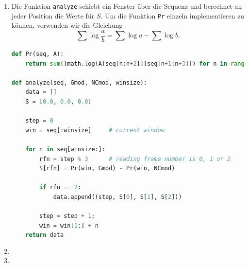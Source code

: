 \documentclass{homework}
\begin{document}
\begin{enumerate}
\begin{enumerate}
\normalsize

\item

Die Funktion \texttt{analyze} schiebt ein Fenster über die Sequenz und berechnet an jeder Position die Werte für $S$.
Um die Funktion \texttt{Pr} einzeln implementieren zu können, verwenden wir die Gleichung
$$\sum \log \frac{a}{b} = \sum \log a - \sum \log b.$$

\begin{lstlisting}[language=python]
def Pr(seq, A):
	return sum([math.log(A[seq[n:n+2]][seq[n+1:n+3]]) for n in range(0, len(seq)-3)])

def analyze(seq, Gmod, NCmod, winsize):
	data = []
	S = [0.0, 0.0, 0.0]

	step = 0
	win = seq[:winsize]		# current window

	for n in seq[winsize:]:
		rfn = step % 3		# reading frame number is 0, 1 or 2
		S[rfn] = Pr(win, Gmod) - Pr(win, NCmod)

		if rfn == 2:
			data.append((step, S[0], S[1], S[2]))

		step = step + 1;
		win = win[1:] + n
	return data
\end{lstlisting}

\item
\item

\end{enumerate}



\end{enumerate}
\end{document}
